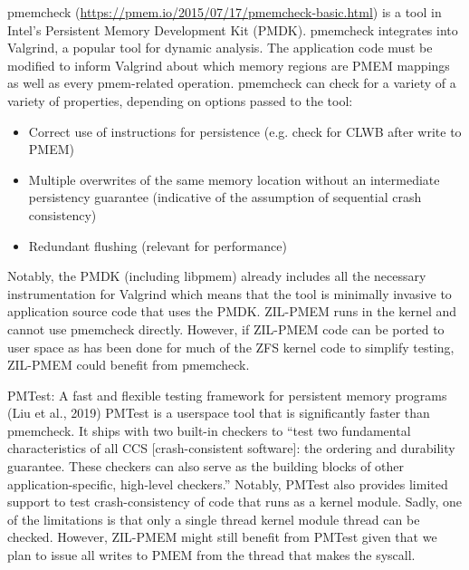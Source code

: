 \documentclass[12pt,a4paper,twoside,draft]{book}
\begin{document}
pmemcheck (\url{https://pmem.io/2015/07/17/pmemcheck-basic.html}) is a tool in Intel’s Persistent Memory Development Kit (PMDK). pmemcheck integrates into Valgrind, a popular tool for dynamic analysis. The application code must be modified to inform Valgrind about which memory regions are PMEM mappings as well as every pmem-related operation. pmemcheck can check for a variety of a variety of properties, depending on options passed to the tool:
\begin{itemize}
    \item Correct use of instructions for persistence (e.g. check for CLWB after write to PMEM)
    \item Multiple overwrites of the same memory location without an intermediate persistency guarantee (indicative of the assumption of sequential crash consistency)
    \item Redundant flushing (relevant for performance)
\end{itemize}
Notably, the PMDK (including libpmem) already includes all the necessary instrumentation for Valgrind which means that the tool is minimally invasive to application source code that uses the PMDK.
ZIL-PMEM runs in the kernel and cannot use pmemcheck directly. However, if ZIL-PMEM code can be ported to user space as has been done for much of the ZFS kernel code to simplify testing, ZIL-PMEM could benefit from pmemcheck.

PMTest: A fast and flexible testing framework for persistent memory programs (Liu et al., 2019) PMTest is a userspace tool that is significantly faster than pmemcheck. It ships with two built-in checkers to “test two fundamental characteristics of all CCS [crash-consistent software]: the ordering and durability guarantee. These checkers can also serve as the building blocks of other application-specific, high-level checkers.”
Notably, PMTest also provides limited support to test crash-consistency of code that runs as a kernel module. Sadly, one of the limitations is that only a single thread kernel module thread can be checked. However, ZIL-PMEM might still benefit from PMTest given that we plan to issue all writes to PMEM from the thread that makes the syscall.
\end{document}
